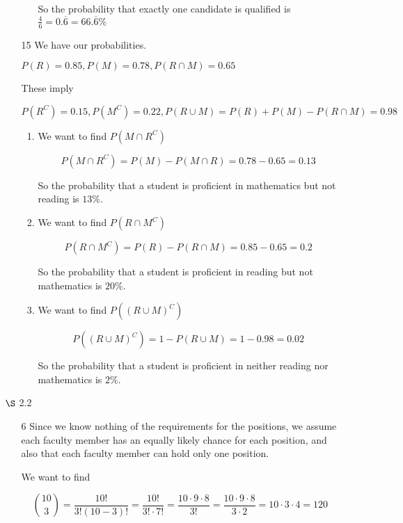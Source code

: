 \documentclass[12pt,letterpaper]{article}
\begin{document}
\begin{enumerate}
\begin{enumerate}
\begin{enumerate}[label=(\arabic*)]
              So the probability that exactly one candidate is qualified is
              $\frac{4}{6} = 0.\overline{6} = 66.\overline{6}\%$
          \end{enumerate}
        \item [15]
          We have our probabilities.

          $P(R) = 0.85, P(M) = 0.78, P(R \cap M) = 0.65$

          These imply

          $P(R^C) = 0.15, P(M^C) = 0.22, P(R \cup M) = P(R) + P(M) - P(R \cap M) = 0.98$
          \begin{enumerate}[label=(\arabic*)]
            \item
              We want to find $P(M \cap R^C)$

              \[
                P(M \cap R^C) = P(M) - P(M \cap R) = 0.78 - 0.65 = 0.13
              \]

              So the probability that a student is proficient in mathematics but not reading is $13\%$.
            \item
              We want to find $P(R \cap M^C)$

              \[
                P(R \cap M^C) = P(R) - P(R \cap M) = 0.85 - 0.65 = 0.2
              \]

              So the probability that a student is proficient in reading but not mathematics is $20\%$.
            \item
              We want to find $P((R \cup M)^C)$

              \[
                P((R \cup M)^C) = 1 - P(R \cup M) = 1 - 0.98 = 0.02
              \]

              So the probability that a student is proficient in neither reading nor mathematics is $2\%$.
          \end{enumerate}
      \end{enumerate}

    \item [$\S$ 2.2]
      \begin{enumerate}
        \item [6]
          Since we know nothing of the requirements for the positions,
          we assume each faculty member has an equally likely chance for each position,
          and also that each faculty member can hold only one position.

          We want to find

          \[
            \binom{10}{3} = \frac{10!}{3!(10 - 3)!} = \frac{10!}{3! \cdot 7!} = \frac{10 \cdot 9 \cdot 8}{3!} = \frac{10 \cdot 9 \cdot 8}{3 \cdot 2} = 10 \cdot 3 \cdot 4 = 120
          \]


\end{enumerate}
\end{enumerate}
\end{document}
